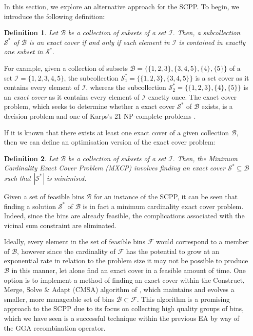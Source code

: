 \documentclass[a4paper,11pt,authoryear]{elsarticle}
\newcommand{\rev}[1]{{\color{myRed}#1}}
\newtheorem{definition}{Definition}
\begin{document}
\noindent In this section, we explore an alternative approach for the SCPP. To begin, we introduce the following definition:

\begin{definition}
	Let $\mathcal{B}$ be a collection of subsets of a set $\mathcal{I}$. Then, a subcollection $\mathcal{S}^*$ of $\mathcal{B}$ is an \emph{exact cover} if and only if each element in $\mathcal{I}$ is contained in exactly one subset in $\mathcal{S}^*$.
	\label{defn:exactcover}
\end{definition}	

\noindent For example, given a collection of subsets $\mathcal{B} = \{\{1,2,3\}, \{3,4,5\}, \{4\}, \{5\}\}$ of a set $\mathcal{I} = \{1,2,3,4,5\}$, the subcollection $\mathcal{S}^*_1 = \{\{1,2,3\}, \{3,4,5\}\}$ is a set cover as it contains every element of $\mathcal{I}$, whereas the subcollection $\mathcal{S}^*_2 = \{\{1,2,3\}, \{4\}, \{5\}\}$ is an \emph{exact cover} as it contains every element of $\mathcal{I}$ exactly once. The exact cover problem, which seeks to determine whether a exact cover $\mathcal{S}^*$ of $\mathcal{B}$ exists, is a decision problem and one of Karps's 21 NP-complete problems \citep{karp1972}.

\rev{If it is known that there exists at least one exact cover of a given collection $\mathcal{B}$, then we can define an optimisation version of the exact cover problem:}

\rev{
\begin{definition}
	Let $\mathcal{B}$ be a collection of subsets of a set $\mathcal{I}$. Then, the \emph{Minimum Cardinality Exact Cover Problem (MXCP)} involves finding an exact cover $\mathcal{S}^* \subseteq \mathcal{B}$ such that $|\mathcal{S}^*|$ is minimised. 
	\label{defn:mxcp}
\end{definition}
}

\noindent Given a set of feasible bins $\mathcal{B}$ for an instance of the SCPP, it can be seen that finding a solution $\mathcal{S}^*$ of $\mathcal{B}$ is in fact a \rev{minimum cardinality exact cover problem}. Indeed, since the bins are already feasible, the complications associated with the vicinal sum constraint are eliminated.

Ideally, every element in the set of feasible bins $\mathcal{F}$ would correspond to a member of $\mathcal{B}$, however since the cardinality of $\mathcal{F}$ has the potential to grow at an exponential rate in relation to the problem size it may not be possible to produce $\mathcal{B}$ in this manner, let alone find an exact cover in a feasible amount of time. One option is to implement a method of finding an exact cover within the Construct, Merge, Solve $\&$ Adapt (CMSA) algorithm of \cite{blum2016}, \rev{which maintains and evolves a smaller, more manageable set of bins $\mathcal{B} \subset \mathcal{F}$. This algorithm is a promising approach to the SCPP due to its focus on collecting high quality groups of bins, which we have seen is a successful technique within the previous EA by way of the GGA recombination operator.}
\end{document}
